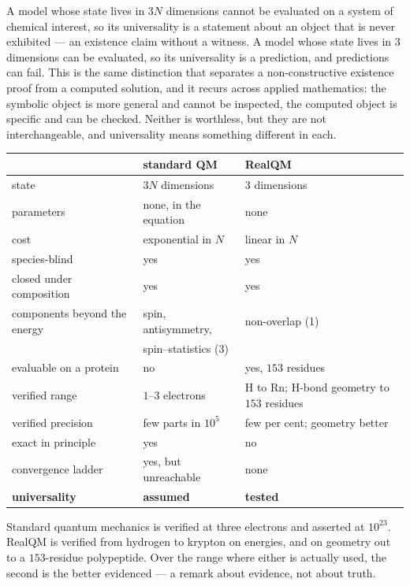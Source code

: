 \documentclass[11pt]{article}
\begin{document}
A model whose state lives in $3N$ dimensions cannot be evaluated on a system of chemical interest,
so its universality is a statement about an object that is never exhibited --- an existence claim
without a witness. A model whose state lives in $3$ dimensions can be evaluated, so its
universality is a prediction, and predictions can fail. This is the same distinction that
separates a non-constructive existence proof from a computed solution, and it recurs across
applied mathematics: the symbolic object is more general and cannot be inspected, the computed
object is specific and can be checked. Neither is worthless, but they are not interchangeable,
and universality means something different in each.

\begin{center}
\begin{tabular}{lll}
\toprule
 & standard QM & RealQM \\
\midrule
state                      & $3N$ dimensions        & $3$ dimensions \\
parameters                 & none, in the equation  & none \\
cost                       & exponential in $N$     & linear in $N$ \\
species-blind              & yes                    & yes \\
closed under composition   & yes                    & yes \\
components beyond the energy & spin, antisymmetry,  & non-overlap (1) \\
                             & spin--statistics (3) & \\
evaluable on a protein     & no                     & yes, $153$ residues \\
verified range             & $1$--$3$ electrons     & H to Rn; H-bond geometry to $153$ residues \\
verified precision         & few parts in $10^5$    & few per cent; geometry better \\
exact in principle         & yes                    & no \\
convergence ladder         & yes, but unreachable   & none \\
\textbf{universality}      & \textbf{assumed}       & \textbf{tested} \\
\bottomrule
\end{tabular}
\end{center}

Standard quantum mechanics is verified at three electrons and asserted at $10^{23}$. RealQM is
verified from hydrogen to krypton on energies, and on geometry out to a $153$-residue
polypeptide. Over the range where either is actually used,
the second is the better evidenced --- a remark about evidence, not about truth.
\end{document}
